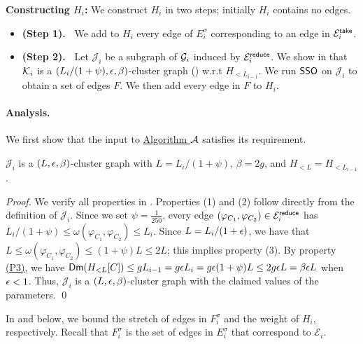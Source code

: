 \begin{tcolorbox}
	\hypertarget{HiConstT2}{}
	\textbf{Constructing $H_i$:} We construct $H_i$ in two steps; initially $H_i$ contains no edges.
	\begin{itemize}[noitemsep]
		\item \textbf{(Step 1).~} We  add to $H_i$ every edge of $E^{\sigma}_{i}$ corresponding to an edge in $\mathcal{E}^{\mathsf{take}}_i$. 

		\item \textbf{(Step 2).~} Let 
		$\mathcal{J}_i$ be a subgraph of $\mathcal{G}_i$ induced by $\mathcal{E}_i^{\mathsf{reduce}}$. We show in   that $\mathcal{K}_i$ is a $(L_i/(1+\psi),\epsilon,\beta)$-cluster graph () w.r.t  $H_{< L_{i-1}}$. We  run \hyperlink{SPHigh}{$\mathsf{SSO}$} on $\mathcal{J}_i$ to obtain a set of edges $F$. We then add every edge in $F$ to $H_i$.
	\end{itemize}
\end{tcolorbox}


\paragraph{Analysis.~} We first show that the input to \hyperlink{SPHigh}{Algorithm $\mathcal{A}$} satisfies its requirement.

\begin{claim}\label{clm:Ki-clustergraph}$\mathcal{J}_i$  is a $(L, \epsilon, \beta)$-cluster graph with $L = {L_i/(1+\psi)}$, $\beta = 2g$,  and  $H_{< L} = H_{< L_{i-1}}$.
\end{claim} 
\begin{proof}
	We verify all properties in . Properties (1) and (2) follow directly from the definition of $\mathcal{J}_i$. Since we set $\psi = \frac{1}{250}$, every edge $(\varphi_{C_1},\varphi_{C_2}) \in \mathcal{E}^{\mathsf{reduce}}_i$  has $L_i/(1+\psi) \leq \omega(\varphi_{C_1},\varphi_{C_2})\leq L_i$. Since $L = L_i/(1+\epsilon)$, we have that $L \leq \omega(\varphi_{C_1},\varphi_{C_2}) \leq (1+\psi)L \leq 2L$; this implies property (3). By property \hyperlink{P3}{(P3)}, we have $\mathsf{Dm}(H_{<L}[C]) \leq gL_{i-1} = g\epsilon L_i = g \epsilon (1+\psi) L \leq 2g \epsilon L = \beta \epsilon L$ when $\epsilon < 1$. Thus, $\mathcal{J}_i$ is a   $(L, \epsilon, \beta)$-cluster graph with the claimed values of the parameters. \qed 
\end{proof}


In   and  below,  we bound the stretch of edges in $F^{\sigma}_i$ and the weight of $H_i$, respectively. Recall that $F^\sigma_{i}$ is the set of edges in $E^{\sigma}_i$ that correspond to $\mathcal{E}_i$.


